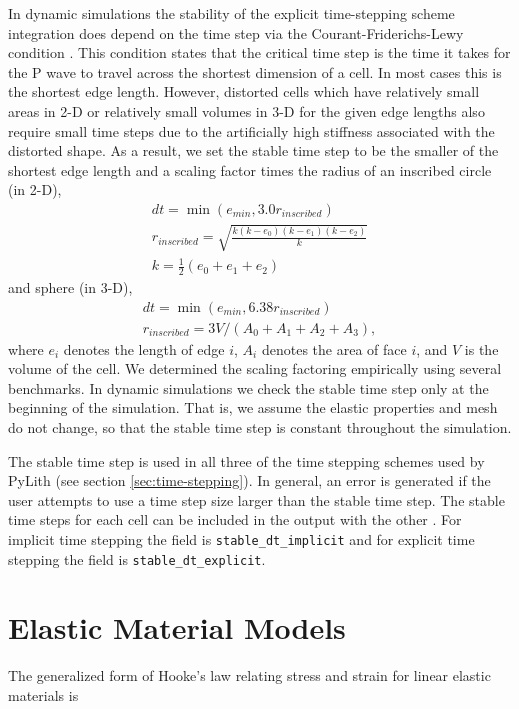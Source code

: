 In dynamic simulations the stability of the explicit time-stepping
scheme integration does depend on the time step via the Courant-Friderichs-Lewy
condition \cite{Courant:etal:1967}. This condition states that the
critical time step is the time it takes for the P wave to travel across
the shortest dimension of a cell. In most cases this is the shortest
edge length. However, distorted cells which have relatively small
areas in 2-D or relatively small volumes in 3-D for the given edge
lengths also require small time steps due to the artificially high
stiffness associated with the distorted shape. As a result, we set
the stable time step to be the smaller of the shortest edge length
and a scaling factor times the radius of an inscribed circle (in 2-D),
\begin{gather}
dt=\min(e_{\mathit{min}},3.0r_{inscribed})\\
r_{inscribed}=\sqrt{\frac{k(k-e_{0})(k-e_{1})(k-e_{2})}{k}}\\
k=\frac{1}{2}(e_{0}+e_{1}+e_{2})
\end{gather}
and sphere (in 3-D),
\begin{gather}
dt=\min(e_{\mathit{min}},6.38r_{inscribed})\\
r_{inscribed}=3V/(A_{0}+A_{1}+A_{2}+A_{3}),
\end{gather}
where $e_{i}$ denotes the length of edge $i$, $A_{i}$ denotes the
area of face $i$, and $V$ is the volume of the cell. We determined
the scaling factoring empirically using several benchmarks. In dynamic
simulations we check the stable time step only at the beginning of
the simulation. That is, we assume the elastic properties and mesh
do not change, so that the stable time step is constant throughout
the simulation.

The stable time step is used in all three of the time stepping schemes
used by PyLith (see section \vref{sec:time-stepping}). In general,
an error is generated if the user attempts to use a time step size
larger than the stable time step. The stable time steps for each cell
can be included in the output with the other .
For implicit time stepping the field is \texttt{stable\_dt\_implicit}
and for explicit time stepping the field is \texttt{stable\_dt\_explicit}.


\section{Elastic Material Models}

The generalized form of Hooke's law relating stress and strain for
linear elastic materials is

